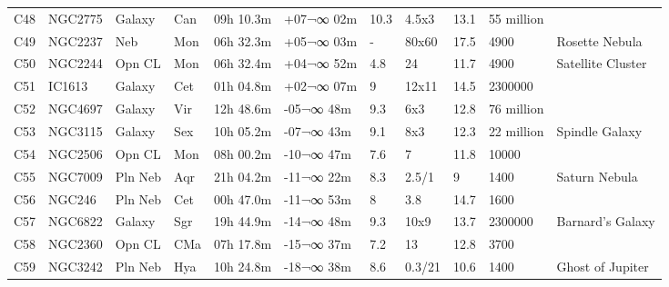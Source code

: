 \documentclass[10pt,twoside,a4paper,english]{report}
\begin{document}
\begin{longtable}{@{}lllllllllll@{}}
C48        & NGC2775     & Galaxy     & Can       & 09h 10.3m & +07¬∞ 02m  & 10.3      & 4.5x3                & 13.1     & 55 million          &                                 \\ 
C49        & NGC2237    & Neb        & Mon       & 06h 32.3m & +05¬∞ 03m  & -         & 80x60                & 17.5     & 4900                & Rosette Nebula                  \\ 
C50        & NGC2244     & Opn CL     & Mon       & 06h 32.4m & +04¬∞ 52m  & 4.8       & 24                   & 11.7     & 4900                & Satellite Cluster               \\ 
C51        & IC1613      & Galaxy     & Cet       & 01h 04.8m & +02¬∞ 07m  & 9         & 12x11                & 14.5     & 2300000             &                                 \\ 
C52        & NGC4697     & Galaxy     & Vir       & 12h 48.6m & -05¬∞ 48m  & 9.3       & 6x3                  & 12.8     & 76 million          &                                 \\ 
C53        & NGC3115     & Galaxy     & Sex       & 10h 05.2m & -07¬∞ 43m  & 9.1       & 8x3                  & 12.3     & 22 million          & Spindle Galaxy                  \\ 
C54        & NGC2506     & Opn CL     & Mon       & 08h 00.2m & -10¬∞ 47m  & 7.6       & 7                    & 11.8     & 10000               &                                 \\ 
C55        & NGC7009     & Pln Neb    & Aqr       & 21h 04.2m & -11¬∞ 22m  & 8.3       & 2.5/1                & 9        & 1400                & Saturn Nebula                   \\ 
C56        & NGC246      & Pln Neb    & Cet       & 00h 47.0m & -11¬∞ 53m  & 8         & 3.8                  & 14.7     & 1600                &                                 \\ 
C57        & NGC6822     & Galaxy     & Sgr       & 19h 44.9m & -14¬∞ 48m  & 9.3       & 10x9                 & 13.7     & 2300000             & Barnard's Galaxy                \\ 
C58        & NGC2360     & Opn CL     & CMa       & 07h 17.8m & -15¬∞ 37m  & 7.2       & 13                   & 12.8     & 3700                &                                 \\ 
C59        & NGC3242     & Pln Neb    & Hya       & 10h 24.8m & -18¬∞ 38m  & 8.6       & 0.3/21               & 10.6     & 1400                & Ghost of Jupiter                \\ 

\end{longtable}
\end{document}
